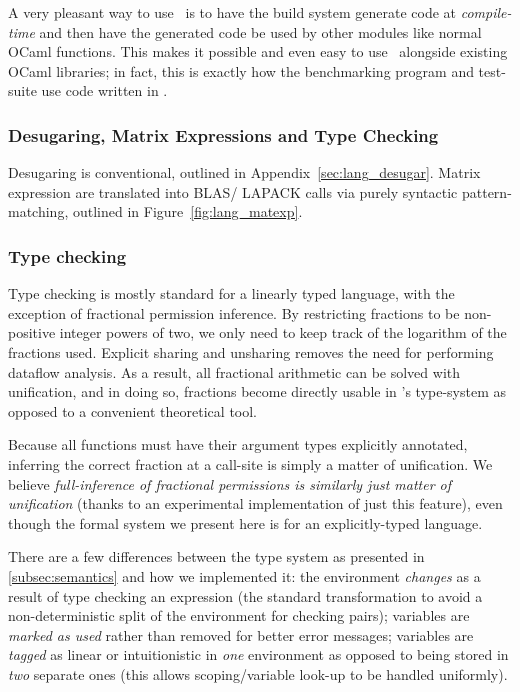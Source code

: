 A very pleasant way to use \lang\ is to have the build system generate code at
\emph{compile-time} and then have the generated code be used by other modules
like normal OCaml functions. This makes it possible and even easy to use \lang\
alongside existing OCaml libraries; in fact, this is exactly how the
benchmarking program and test-suite use code written in \lang.

\subsubsection{Desugaring, Matrix Expressions and Type Checking}\label{subsubsec:initial}

Desugaring is conventional, outlined in Appendix~\ref{sec:lang_desugar}.  Matrix
expression are translated into BLAS/ LAPACK calls via purely syntactic
pattern-matching, outlined in Figure~\ref{fig:lang_matexp}.

\subsubsection{Type checking}

Type checking is mostly standard for a linearly typed language,
with the exception of fractional permission inference. By restricting fractions
to be non-positive integer powers of two, we only need to keep track of the
logarithm of the fractions used. Explicit sharing and unsharing removes the
need for performing dataflow analysis. As a result, all fractional arithmetic
can be solved with unification, and in doing so, fractions become directly
usable in \lang's type-system as opposed to a convenient theoretical tool.

Because all functions must have their argument types explicitly annotated,
inferring the correct fraction at a call-site is simply a matter of
unification. We believe \emph{full-inference of fractional permissions is
similarly just matter of unification} (thanks to an experimental implementation
of just this feature), even though the formal system we present here is for an
explicitly-typed language.

There are a few differences between the type system as presented in
\ref{subsec:semantics} and how we implemented it: the environment
\emph{changes} as a result of type checking an expression (the standard
transformation to avoid a non-deterministic split of the environment for
checking pairs); variables are \emph{marked as used} rather than removed for
better error messages; variables are \emph{tagged} as linear or intuitionistic
in \emph{one} environment as opposed to being stored in \emph{two} separate
ones (this allows scoping/variable look-up to be handled uniformly).

